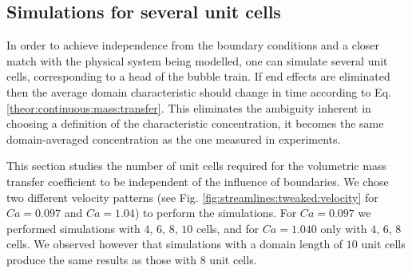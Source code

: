 \documentclass[review,12pt]{elsarticle}
\begin{document}

\subsection{Simulations for several unit cells}
In order to achieve independence from the boundary conditions and a closer match with
the physical system being modelled, one can simulate several unit cells, corresponding
to a head of the bubble train.  If end effects are eliminated then the average
domain characteristic should change in time according to Eq.
\ref{theor:continuous:mass:transfer}. This eliminates the ambiguity inherent in choosing a definition
of the characteristic concentration, it becomes the same domain-averaged concentration
as the one measured in experiments.

This section studies the number of unit cells required for the volumetric
mass transfer coefficient to be independent of the influence of boundaries. We chose two
different
velocity patterns (see Fig. \ref{fig:streamlines:tweaked:velocity} for $Ca=0.097$ and $Ca=1.04$) to
perform the simulations. For $Ca=0.097$ we performed simulations with
$4$, $6$, $8$, $10$ cells, and for $Ca=1.040$ only with $4$, $6$, $8$ cells.
We observed however that simulations with a domain length of $10$ unit cells produce the same results as those with $8$ unit cells.
\end{document}
